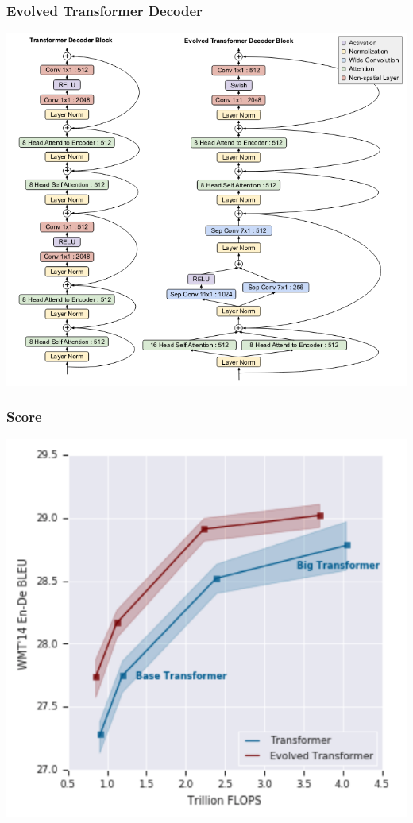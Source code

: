 \documentclass{beamer}
\begin{document}
\begin{frame}
    \frametitle{Evolved Transformer Decoder}
    \begin{center}
        \includegraphics[scale=1.25]{img/evolved-transformer-decoder.png}
    \end{center}
\end{frame}

\begin{frame}
    \frametitle{Score}
    \begin{center}
        \includegraphics[scale=1.5]{img/evolved-transformer-score.png}
    \end{center}
\end{frame}
\end{document}
